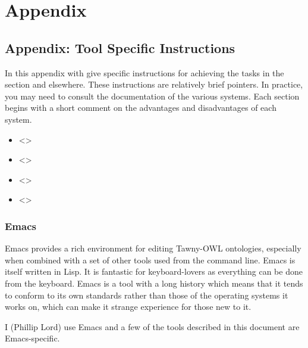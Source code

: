 
\section{Appendix}
\label{sec-6}

\subsection{Appendix: Tool Specific Instructions}
\label{sec-6-1}

In this appendix with give specific instructions for achieving the tasks
in the \label{/getting/started-Getting-Started} section and elsewhere. These
instructions are relatively brief pointers. In practice, you may need to
consult the documentation of the various systems. Each section begins
with a short comment on the advantages and disadvantages of each system.

\begin{itemize}
\item <>
\item <>
\item <>
\item <>
\end{itemize}

\subsubsection{Emacs}
\label{sec-6-1-1}

Emacs provides a rich environment for editing Tawny-OWL ontologies,
especially when combined with a set of other tools used from the command
line. Emacs is itself written in Lisp. It is fantastic for
keyboard-lovers as everything can be done from the keyboard. Emacs is a
tool with a long history which means that it tends to conform to its own
standards rather than those of the operating systems it works on, which
can make it strange experience for those new to it.

I (Phillip Lord) use Emacs and a few of the tools described in this
document are Emacs-specific.

